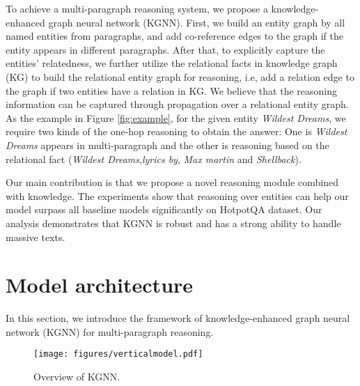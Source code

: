 \documentclass[11pt,a4paper]{article}
\newcommand\OurModel{KGNN\xspace}
\begin{document}
To achieve a multi-paragraph reasoning system, we propose a knowledge-enhanced graph neural network (KGNN). First, we build an entity graph by all named entities from paragraphs, and add co-reference edges to the graph if the entity appears in different paragraphs. After that, to explicitly capture the entities' relatedness, we further utilize the relational facts in knowledge graph (KG) to build the relational entity graph for reasoning, i.e, add a relation edge to the graph if two entities have a relation in KG. We believe that the reasoning information can be captured through propagation over a relational entity graph.
As the example in Figure \ref{fig:example}, for the given entity \emph{Wildest Dreams}, we require two kinds of the one-hop reasoning to obtain the answer: One is \emph{Wildest Dreams} appears in multi-paragraph and the other is reasoning based on the relational fact (\emph{Wildest Dreams},\emph{lyrics by}, \emph{Max martin} and \emph{Shellback}).



Our main contribution is that we propose a novel reasoning module combined with knowledge. The experiments show that reasoning over entities can help our model surpass all baseline models significantly on HotpotQA dataset. Our analysis demonstrates that \OurModel is robust and has a strong ability to handle massive texts.





















\section{Model architecture}
\label{sec:method}

In this section, we introduce the framework of knowledge-enhanced graph neural network (KGNN) for multi-paragraph reasoning.

\begin{figure}[t]
    \centering
\texttt{[image: figures/verticalmodel.pdf]}
    \caption{Overview of \OurModel.}
    \label{fig:main}
    \vspace{-1.5em}
\end{figure}
\end{document}
